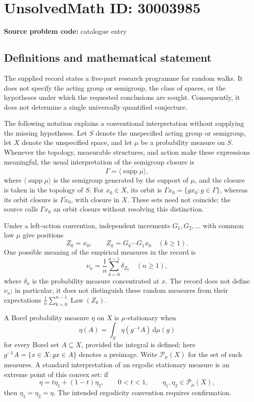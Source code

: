 \documentclass[11pt]{article}
\begin{document}
\section*{UnsolvedMath ID: 30003985}
\textbf{Source problem code:} catalogue entry
\subsection{Definitions and mathematical statement}
The supplied record states a five-part research programme for random walks. It does not specify the acting group or semigroup, the class of spaces, or the hypotheses under which the requested conclusions are sought. Consequently, it does not determine a single universally quantified conjecture.

The following notation explains a conventional interpretation without supplying the missing hypotheses. Let \(S\) denote the unspecified acting group or semigroup, let \(X\) denote the unspecified space, and let \(\mu\) be a probability measure on \(S\). Whenever the topology, measurable structures, and action make these expressions meaningful, the usual interpretation of the semigroup closure is
\[
\Gamma=\overline{\langle\operatorname{supp}\mu\rangle},
\]
where \(\langle\operatorname{supp}\mu\rangle\) is the semigroup generated by the support of \(\mu\), and the closure is taken in the topology of \(S\). For \(x_0\in X\), its orbit is \(\Gamma x_0=\{g x_0:g\in\Gamma\}\), whereas its orbit closure is \(\overline{\Gamma x_0}\), with closure in \(X\). These sets need not coincide; the source calls \(\Gamma x_0\) an orbit closure without resolving this distinction.

Under a left-action convention, independent increments \(G_1,G_2,\ldots\) with common law \(\mu\) give positions
\[
Z_0=x_0,\qquad Z_k=G_k\cdots G_1x_0\quad(k\geq1).
\]
One possible meaning of the empirical measures in the record is
\[
\nu_n=\frac1n\sum_{k=0}^{n-1}\delta_{Z_k}\quad(n\geq1),
\]
where \(\delta_x\) is the probability measure concentrated at \(x\). The record does not define \(\nu_n\); in particular, it does not distinguish these random measures from their expectations \(\frac1n\sum_{k=0}^{n-1}\operatorname{Law}(Z_k)\).

A Borel probability measure \(\eta\) on \(X\) is \(\mu\)-stationary when
\[
\eta(A)=\int_S\eta(g^{-1}A)\,\mathrm d\mu(g)
\]
for every Borel set \(A\subseteq X\), provided the integral is defined; here \(g^{-1}A=\{x\in X:gx\in A\}\) denotes a preimage. Write \(\mathcal P_\mu(X)\) for the set of such measures. A standard interpretation of an ergodic stationary measure is an extreme point of this convex set: if
\[
\eta=t\eta_1+(1-t)\eta_2,\qquad 0<t<1,\qquad \eta_1,\eta_2\in\mathcal P_\mu(X),
\]
then \(\eta_1=\eta_2=\eta\). The intended ergodicity convention requires confirmation.
\end{document}
